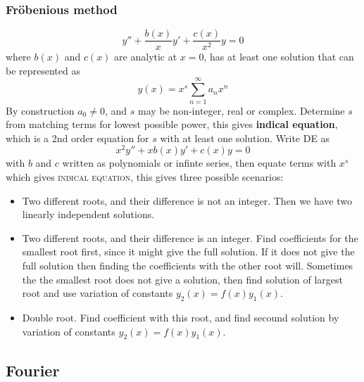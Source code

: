 \documentclass[a4paper, 10pt]{article}
\begin{document}
\begin{multicols*}{3}
\subsubsection*{\small Fröbenious method}
$$y'' + \frac{b(x)}{x}y' + \frac{c(x)}{x^2}y = 0 $$
where $b(x)$ and $c(x)$ are analytic at $x=0$, has at least one solution that can be represented as
$$y(x) = x^s \sum_{n=1}^{\infty} a_n x^n$$
By construction $a_0 \neq 0$, and $s$ may be non-integer, real or complex.
Determine $s$ from matching terms for lowest possible power, this gives \textbf{indical equation}, which is a 2nd order equation for $s$ with at least one solution. Write DE as
$$ x^2y'' + xb(x)y' + c(x)y = 0$$
with $b$ and $c$ written as polynomials or infinte series, then equate terms with $x^s$ which gives \textsc{indical equation}, this gives three possible scenarios:
\begin{itemize}
  \item Two different roots, and their difference is not an integer. Then we have two linearly independent solutions.
  \item Two different roots, and their difference is an integer. Find coefficients for the smallest root first, since it might give the full solution. If it does not give the full solution then finding the coefficients with the other root will. Sometimes the the smallest root does not give a solution, then find solution of largest root and use variation of constants $y_2(x) = f(x)y_1(x)$.
  \item Double root. Find coefficient with this root, and find secound solution by variation of constants $y_2(x) = f(x)y_1(x)$.
\end{itemize}

\newpage
\begin{mdframed}
\subsection*{Fourier}
\end{mdframed}

\end{multicols*}
\end{document}
